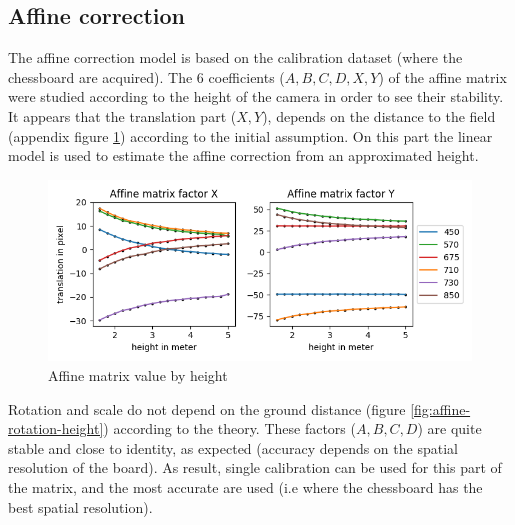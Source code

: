 \documentclass[a4paper,twoside]{article}
\begin{document}
	\subsection{Affine correction}
	
	The affine correction model is based on the calibration dataset (where the chessboard are acquired).
	The 6 coefficients ($A,B,C,D,X,Y$) of the affine matrix were studied according to the height of the camera in order to see their stability.
	It appears that the translation part ($X,Y$), depends on the distance to the field
	(appendix figure \ref{fig:affine-translation-height}) according to the initial assumption.
	On this part the linear model is used to estimate the affine correction from an approximated height.
	
	\begin{figure}[h]
		\centering
		\includegraphics[width=\linewidth]{../figures/affine-translation-height.png}
		\caption{Affine matrix value by height}
		\label{fig:affine-translation-height}
	\end{figure}

	Rotation and scale do not depend on the ground distance (figure \ref{fig:affine-rotation-height}) according to the theory.
	These factors ($A,B,C,D$) are quite stable and close to identity, as expected (accuracy depends on the spatial resolution of the board).
	As result, single calibration can be used for this part of the matrix, and the most accurate are used (i.e where the chessboard has the best spatial resolution).
	
\end{document}
